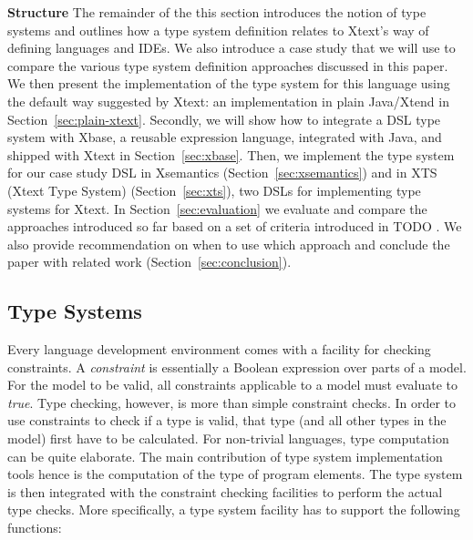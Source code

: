\textbf{Structure} The remainder of the this section introduces the notion of
type systems and outlines how a type system definition relates to Xtext's way of
defining languages and IDEs. We also introduce a case study that we will use to
compare the various type system definition approaches discussed in this paper. We then
present the implementation of the type system for this language using the
default way suggested by Xtext: an implementation in plain Java/Xtend 
in Section~\ref{sec:plain-xtext}. Secondly, we will show how to integrate a DSL
type system with Xbase, a reusable expression language, integrated
with Java, and shipped with Xtext in Section~\ref{sec:xbase}. Then, we implement
the type system for our case study DSL in Xsemantics (Section~\ref{sec:xsemantics}) and 
in XTS (Xtext Type System) (Section~\ref{sec:xts}), two DSLs for implementing
type systems for Xtext. In Section~\ref{sec:evaluation} we evaluate and compare
the approaches introduced so far based on a set of criteria introduced in TODO
. We also provide recommendation on when to use which approach and 
conclude the paper with related work (Section~\ref{sec:conclusion}).

\subsection{Type Systems}

Every language development environment comes with a facility for checking
constraints. A \emph{constraint} is essentially a Boolean expression over parts
of a model. For the model to be valid, all constraints applicable to a model
must evaluate to \emph{true}. Type checking, however, is more than simple
constraint checks. In order to use constraints to check if a type is valid,
that type (and all other types in the model) first have to be calculated. For
non-trivial languages, type computation can be quite elaborate. The main
contribution of type system implementation tools hence is the computation of the
type of program elements. The type system is then integrated with the constraint
checking facilities to perform the actual type checks. More specifically, a type
system facility has to support the following functions:

